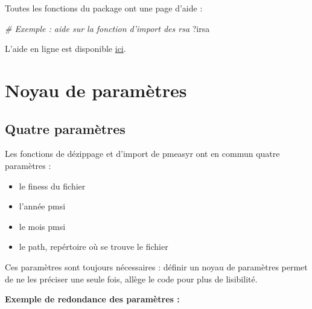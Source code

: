 \documentclass[]{book}
\newenvironment{Shaded}{\begin{snugshade}}{\end{snugshade}}
\newcommand{\CommentTok}[1]{\textcolor[rgb]{0.56,0.35,0.01}{\textit{#1}}}
\newcommand{\NormalTok}[1]{#1}
\providecommand{\tightlist}{%
  \setlength{\itemsep}{0pt}\setlength{\parskip}{0pt}}
\begin{document}
Toutes les fonctions du package ont une page d'aide :

\begin{Shaded}
\begin{Highlighting}[]
\CommentTok{# Exemple : aide sur la fonction d'import des rsa}
\NormalTok{?irsa}
\end{Highlighting}
\end{Shaded}

L'aide en ligne est disponible \href{https://guillaumepressiat.github.io/pmeasyr}{ici}.

\hypertarget{noyau-de-parametres}{%
\chapter{Noyau de paramètres}\label{noyau-de-parametres}}

\hypertarget{quatre-parametres}{%
\section{Quatre paramètres}\label{quatre-parametres}}

Les fonctions de dézippage et d'import de pmeasyr ont en commun quatre paramètres :

\begin{itemize}
\tightlist
\item
  le finess du fichier
\item
  l'année pmsi
\item
  le mois pmsi
\item
  le path, repértoire où se trouve le fichier
\end{itemize}

Ces paramètres sont toujours nécessaires : définir un noyau de paramètres permet de ne les préciser une seule fois, allège le code pour plus de lisibilité.

\textbf{Exemple de redondance des paramètres :}
\end{document}
